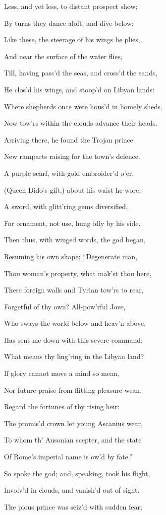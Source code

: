 Less, and yet less, to distant prospect show;

By turns they dance aloft, and dive below:

Like these, the steerage of his wings he plies,

And near the surface of the water flies,

Till, having pass’d the seas, and cross’d the sands,

He clos’d his wings, and stoop’d on Libyan lands:

Where shepherds once were hous’d in homely sheds,

Now tow’rs within the clouds advance their heads.

Arriving there, he found the Trojan prince

New ramparts raising for the town’s defence.

A purple scarf, with gold embroider’d o’er,

(Queen Dido’s gift,) about his waist he wore;

A sword, with glitt’ring gems diversified,

For ornament, not use, hung idly by his side.

Then thus, with winged words, the god began,

Resuming his own shape: “Degenerate man,

Thou woman’s property, what mak’st thou here,

These foreign walls and Tyrian tow’rs to rear,

Forgetful of thy own? All-pow’rful Jove,

Who sways the world below and heav’n above,

Has sent me down with this severe command:

What means thy ling’ring in the Libyan land?

If glory cannot move a mind so mean,

Nor future praise from flitting pleasure wean,

Regard the fortunes of thy rising heir:

The promis’d crown let young Ascanius wear,

To whom th’ Ausonian scepter, and the state

Of Rome’s imperial name is ow’d by fate.”

So spoke the god; and, speaking, took his flight,

Involv’d in clouds, and vanish’d out of sight.

The pious prince was seiz’d with sudden fear;

